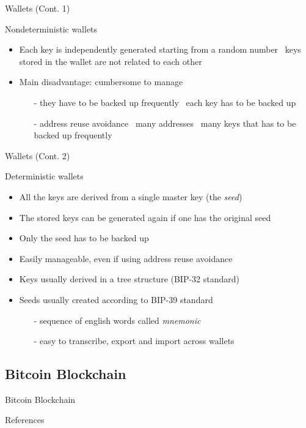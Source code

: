 \documentclass{beamer}
\begin{document}
  \begin{frame}{Wallets (Cont. 1)}
    \begin{block}{Nondeterministic wallets}
      \begin{itemize}
        \item Each key is independently generated starting from a random number
        \MVRightarrow\, keys stored in the wallet are not related to each other \pause
        \item Main disadvantage: cumbersome to manage \pause
        \begin{itemize}
          \item[-] they have to be backed up frequently \MVRightarrow\, each key
          has to be backed up \pause
          \item[-] address reuse avoidance \MVRightarrow\, many addresses \MVRightarrow\,
          many keys that has to be backed up frequently
        \end{itemize}
      \end{itemize}
    \end{block}
  \end{frame}




  \begin{frame}{Wallets (Cont. 2)}
    \begin{block}{Deterministic wallets}
      \begin{itemize}
        \item All the keys are derived from a single master key (the \emph{seed}) \pause
        \item The stored keys can be generated again if one has the original seed \pause
        \item Only the seed has to be backed up \pause
        \item Easily manageable, even if using address reuse avoidance \pause
        \item Keys usually derived in a tree structure (BIP-32 standard) \pause
        \item Seeds usually created according to BIP-39 standard \pause
        \begin{itemize}
          \item[-] sequence of english words called \emph{mnemonic} \pause
          \item[-] easy to transcribe, export and import across wallets
        \end{itemize}
      \end{itemize}
    \end{block}
  \end{frame}




  \subsection{Bitcoin Blockchain}
  \begin{frame}{Bitcoin Blockchain}

  \end{frame}











  \begin{frame}{References}
    \printbibliography
  \end{frame}
\end{document}
